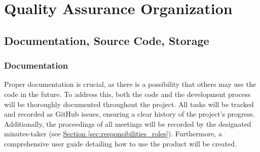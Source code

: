 \section{Quality Assurance Organization}

\subsection{Documentation, Source Code, Storage} \label{sec:documentation_storage_source_code}

\begin{comment}
    Documentation
        Andre skal kanskje bruke eller gjenbruke produktet vårt, så viktig med dokumentasjon av både sluttproduktet, i tillegg til hele prosessen.

        Commitmeldingsstandard

        Kode-produkter(?)
            Deployment
            APIdoc

        Arbeidsprosessen
            Så mye som mulig skal ligge under issues under GitHub Project, slik at vi dokumenterer hva vi har gjort. Timeføring blir gjort i Traggo som er tag-basert, slik at vi kan se hvor lenge vi har jobbet med feks admin, thesis, metting osv.
        
        Møter og enigheter
            Møtenotater/referat skal bli tatt av alle møter
            Alle viktige valg som blir gjort etter diskusjoner blir notert

    Source code
        Dokumentasjon av koden kommer til å bli brukt av gruppemedlemene, men kan også bli brukt av noen som vil videreutvikle produktet.
        Følge industri-standard dokumentasjon og kodestil for hvert kodespråk, med hyppig bruk av en linter. 
        Prøve å skrive self-documenting code ved å ha descriptive funksjonsnavn og variabler, slik at man kan holde kodekommentarene korte og konsise
        
\end{comment}
\subsubsection{Documentation}  
Proper documentation is crucial, as there is a possibility that others may use the code in the future. To address this, both the code and the development process will be thoroughly documented throughout the project. All tasks will be tracked and recorded as GitHub issues, ensuring a clear history of the project's progress. Additionally, the proceedings of all meetings will be recorded by the designated minutes-taker (see \hyperref[sec:responsibilities_roles]{Section \ref*{sec:responsibilities_roles}}). Furthermore, a comprehensive user guide detailing how to use the product will be created.  

